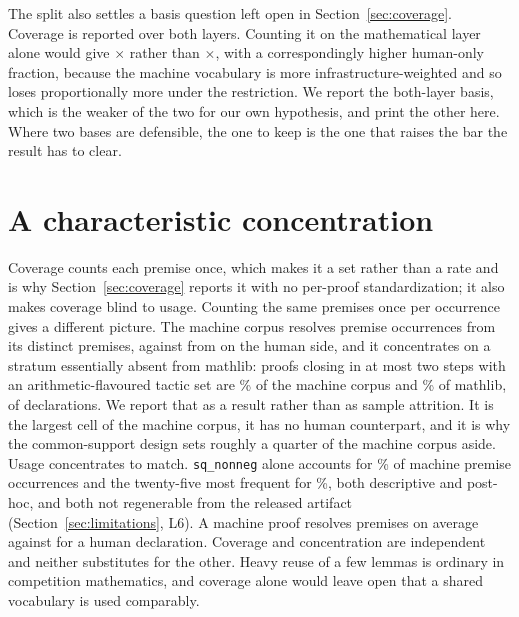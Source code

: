 The split also settles a basis question left open in
Section~\ref{sec:coverage}. Coverage is reported over both layers. Counting it
on the mathematical layer alone would give \vocabRatioMathOnly{}$\times$
rather than \vocabRatio{}$\times$, with a correspondingly higher human-only
fraction, because the machine vocabulary is more infrastructure-weighted and
so loses proportionally more under the restriction. We report the both-layer
basis, which is the weaker of the two for our own hypothesis, and print the
other here. Where two bases are defensible, the one to keep is the one that
raises the bar the result has to clear.

\section{A characteristic concentration}
\label{sec:concentration}

Coverage counts each premise once, which makes it a set rather than a rate and
is why Section~\ref{sec:coverage} reports it with no per-proof standardization;
it also makes coverage blind to usage. Counting the same premises once per
occurrence gives a different picture. The machine corpus resolves
\machineOccurrences{} premise occurrences from its \machineVocab{} distinct
premises, against \humanOccurrences{} from \humanVocab{} on the human side, and
it concentrates on a stratum essentially absent from mathlib: proofs closing in
at most two steps with an arithmetic-flavoured tactic set are
\degenerateMachineSharePct{}\% of the machine corpus and
\degenerateHumanSharePct{}\% of mathlib, \degenerateHumanCount{} of
\humanProofs{} declarations. We report that as a result rather than as sample
attrition. It is the largest cell of the machine corpus, it has no human
counterpart, and it is why the common-support design sets roughly a quarter of
the machine corpus aside. Usage concentrates to match. \texttt{sq\_nonneg}
alone accounts for \sqNonnegOccurrencePct{}\% of machine premise occurrences
and the twenty-five most frequent for \topTwentyFiveOccurrencePct{}\%, both
descriptive and post-hoc, and both not regenerable from the released artifact
(Section~\ref{sec:limitations}, L6). A machine proof resolves
\machinePremisesPerProof{} premises on average against
\humanPremisesPerProof{} for a human declaration. Coverage and concentration
are independent and neither substitutes for the other. Heavy reuse of a few
lemmas is ordinary in competition mathematics, and coverage alone would leave
open that a shared vocabulary is used comparably.

